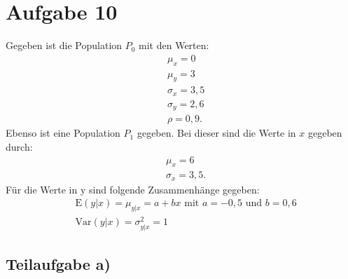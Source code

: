 \section{Aufgabe 10}
Gegeben ist die Population $P_0$ mit den Werten:
\begin{align}
  &\mu_x = 0 \\
  &\mu_y = 3 \\
  &\sigma_x = 3{,}5 \\
  &\sigma_y = 2{,}6 \\
  &\rho=0,9.
\end{align}
Ebenso ist eine Population $P_1$ gegeben. Bei dieser sind die Werte in $x$ gegeben durch:
\begin{align}
  &\mu_x = 6 \\
  &\sigma_x = 3{,}5 \text{.}
\end{align}
Für die Werte in y sind folgende Zusammenhänge gegeben:
\begin{align}
  &\text{E}(y\lvert x) = \mu_{y\lvert x} = a + bx \text{ mit } a  = -0{,}5 \text{  und } b=0{,}6 \label{eqn:Exy0} \\
  &\text{Var}(y\lvert x) = \sigma_{y\lvert x}^2 = 1
\end{align}


\subsection{Teilaufgabe a)}
